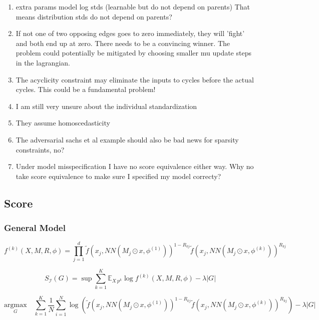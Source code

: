 \documentclass{article}
\begin{document}
\begin{enumerate}
    \item extra params model log stds (learnable but do not depend on parents) That means distribution stds do not depend on parents?
    \item If not one of two opposing edges goes to zero immediately, they will 'fight' and both end up at zero. There needs to be a convincing winner. The problem could potentially be mitigated by choosing smaller mu update steps in the lagrangian.
    \item The acyclicity constraint may eliminate the inputs to cycles before the actual cycles. This could be a fundamental problem!
    \item I am still very unsure about the individual standardization
    \item They assume homoscedasticity
    \item The adversarial sachs et al example should also be bad news for sparsity constraints, no?
    \item Under model misspecification I have no score equivalence either way. Why no take score equivalence to make sure I specified my model correcty?
\end{enumerate}

\subsection{Score}

    

\subsubsection{General Model}
\begin{equation}
    f^{(k)}(X, M, R, \phi) = \prod_{j=1}^{d} \tilde{f}(x_j, NN(M_j \odot x, \phi^{(1)}))^{1-R_{kj}} \tilde{f}(x_j, NN(M_j \odot x, \phi^{(k)}))^{R_{kj}}
\end{equation}

\begin{equation}
    S_{\mathcal{I}}(G) = \sup \sum_{k=1}^K \mathbb{E}_{X ~ p^{k}} \log f^{(k)}(X, M, R, \phi) - \lambda |G|
\end{equation}

\begin{equation}
    \underset{G}{\mathrm{argmax}} \quad \sum_{k=1}^K \frac{1}{N} \sum_{i=1}^N \log(\tilde{f}(x_j, NN(M_j \odot x, \phi^{(1)}))^{1-R_{kj}} \tilde{f}(x_j, NN(M_j \odot x, \phi^{(k)}))^{R_{kj}}) - \lambda |G|
\end{equation}
\end{document}
